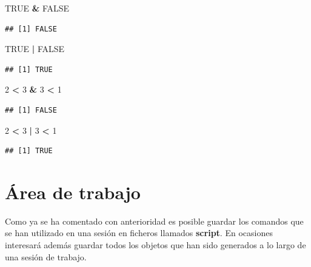 \documentclass[]{book}
\newenvironment{Shaded}{\begin{snugshade}}{\end{snugshade}}
\newcommand{\DecValTok}[1]{\textcolor[rgb]{0.00,0.00,0.81}{#1}}
\newcommand{\StringTok}[1]{\textcolor[rgb]{0.31,0.60,0.02}{#1}}
\newcommand{\OtherTok}[1]{\textcolor[rgb]{0.56,0.35,0.01}{#1}}
\newcommand{\OperatorTok}[1]{\textcolor[rgb]{0.81,0.36,0.00}{\textbf{#1}}}
\begin{document}
\begin{Shaded}
\begin{Highlighting}[]
\OtherTok{TRUE} \OperatorTok{&}\StringTok{ }\OtherTok{FALSE}
\end{Highlighting}
\end{Shaded}

\begin{verbatim}
## [1] FALSE
\end{verbatim}

\begin{Shaded}
\begin{Highlighting}[]
\OtherTok{TRUE} \OperatorTok{|}\StringTok{ }\OtherTok{FALSE}
\end{Highlighting}
\end{Shaded}

\begin{verbatim}
## [1] TRUE
\end{verbatim}

\begin{Shaded}
\begin{Highlighting}[]
\DecValTok{2} \OperatorTok{<}\StringTok{ }\DecValTok{3} \OperatorTok{&}\StringTok{ }\DecValTok{3} \OperatorTok{<}\StringTok{ }\DecValTok{1}
\end{Highlighting}
\end{Shaded}

\begin{verbatim}
## [1] FALSE
\end{verbatim}

\begin{Shaded}
\begin{Highlighting}[]
\DecValTok{2} \OperatorTok{<}\StringTok{ }\DecValTok{3} \OperatorTok{|}\StringTok{ }\DecValTok{3} \OperatorTok{<}\StringTok{ }\DecValTok{1}
\end{Highlighting}
\end{Shaded}

\begin{verbatim}
## [1] TRUE
\end{verbatim}

\section{Área de trabajo}\label{area-de-trabajo}

Como ya se ha comentado con anterioridad es posible guardar los comandos
que se han utilizado en una sesión en ficheros llamados \textbf{script}.
En ocasiones interesará además guardar todos los objetos que han sido
generados a lo largo de una sesión de trabajo.
\end{document}

